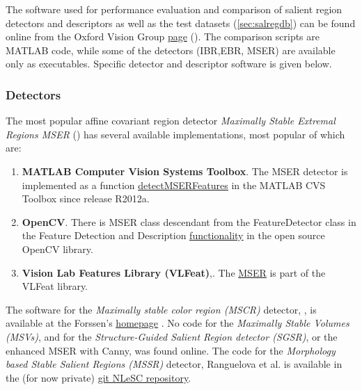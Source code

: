 {The software used for performance evaluation and comparison of salient region detectors and descriptors \cite{Mikolajczyk:2005} as well as the test datasets (\ref{sec:salregdb}) can be found online from the Oxford Vision Group \href{http://www.robots.ox.ac.uk/~vgg/research/affine/index.html}{\underline{page}} (\cite{vgg_soft_data}). The comparison scripts are MATLAB code, while some of the detectors (IBR,EBR, MSER) are available only as executables. Specific detector and descriptor software is given below.

\subsubsection{Detectors}\label{soft:salregdet:subsec}

The most popular affine covariant region detector {\em Maximally Stable Extremal Regions MSER} (\cite{Matas2002BMVC}) has several available implementations, most popular of which are:
\begin{enumerate}
\item{{\bf MATLAB Computer Vision Systems Toolbox}. The MSER detector is implemented as a function \href{http://nl.mathworks.com/help/vision/ref/detectmserfeatures.html}{\underline{\textsf{detectMSERFeatures}}} in the MATLAB CVS Toolbox since release R2012a.} 
\item{{\bf OpenCV}. There is MSER class descendant from the \textsf{FeatureDetector} class in the Feature Detection and Description \href{http://docs.opencv.org/modules/features2d/doc/feature_detection_and_description.html}{ \underline{functionality}} in the open source OpenCV library.}
\item{{\bf Vision Lab Features Library (VLFeat)},\cite{vlfeat_soft}. The \href{http://www.vlfeat.org/api/mser.html}{\underline{MSER}} is part of the VLFeat library.}
\end{enumerate}
The software for the  {\em Maximally stable color region (MSCR)} detector, \cite{Forssen07}, is available at the Forssen's \href{http://www.cs.ubc.ca/~perfo/mscr/}{\underline{homepage}} \cite{forssen07_soft}.
No code for the {\em Maximally Stable Volumes (MSVs)}, \cite{DonoserB06} and for the {\em Structure-Guided Salient Region detector (SGSR)}, \cite{Fan08} or the enhanced MSER with Canny,\cite{Wang14}  was found online.
The code for the  {\em Morphology based Stable Salient Regions (MSSR) } detector, Ranguelova et al. \cite{RangMSSR06, RangHumpb06} is available in the (for now private) \href{https://github.com/NLeSC/LargeScaleImaging/tree/master/Software}{\underline{git NLeSC repository}}.

}
